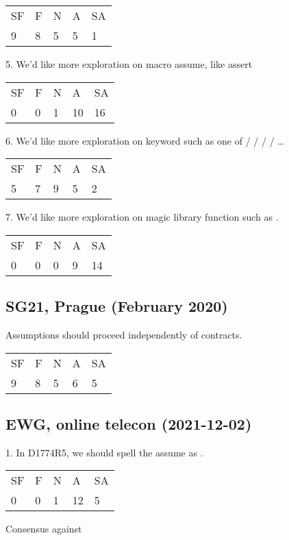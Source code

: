 \hspace{6mm}
\begin{tabular}{lllll}
SF & F & N & A & SA \\
9 & 8 & 5 & 5 & 1
\end{tabular}

5. We’d like more exploration on macro assume, like assert

\hspace{6mm}
\begin{tabular}{lllll}
SF & F & N & A & SA \\
0 & 0 & 1 & 10 & 16
\end{tabular}

6. We’d like more exploration on keyword such as one of  /  /  /  / …

\hspace{6mm}
\begin{tabular}{lllll}
SF & F & N & A & SA \\
5 & 7 & 9 & 5 & 2
\end{tabular}

7. We’d like more exploration on magic library function such as .

\hspace{6mm}
\begin{tabular}{lllll}
SF & F & N & A & SA \\
0 & 0 & 0 & 9 & 14
\end{tabular}

\subsection{SG21, Prague (February 2020)}

Assumptions should proceed independently of contracts.

\hspace{6mm}
\begin{tabular}{lllll}
SF & F & N & A & SA \\
9 & 8 & 5 & 6 & 5
\end{tabular}

\subsection{EWG, online telecon (2021-12-02)}

1. In D1774R5, we should spell the assume as .

\hspace{6mm}
\begin{tabular}{lllll}
SF & F & N & A & SA \\
0 & 0 & 1 & 12 & 5
\end{tabular}
\hspace{5mm}Consensus against

